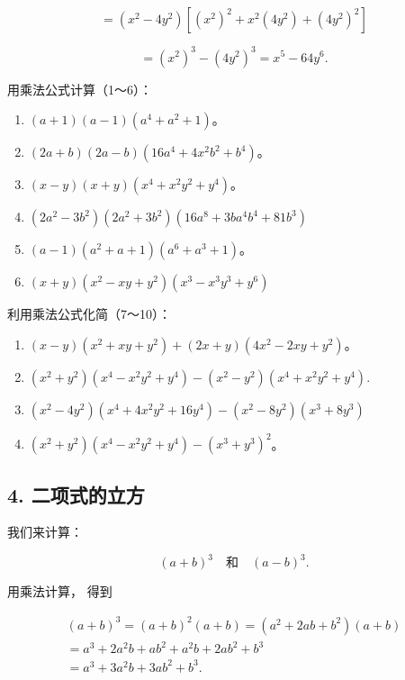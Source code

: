 \[
= (x ^{2} - 4 y ^{2}) [ (x ^{2}) ^{2} + x ^{2} (4 y ^{2}) + (4 y ^{2}) ^{2} ]
\]

\[
= (x ^{2}) ^{3} - (4 y ^{2}) ^{3} = x ^{5} - 64 y ^{6}.
\]

用乘法公式计算（1～6）：

\begin{enumerate}[start=1]
\item
  \((a + 1)(a - 1)(a^4 + a^2 + 1)\)。
\item
  \((2a + b)(2a - b)(16a^4 + 4x^2b^2 + b^4)\)。
\item
  \((x - y)(x + y)(x^4 + x^2y^2 + y^4)\)。
\item
  \((2a^{2} - 3b^{2})(2a^{2} + 3b^{2})(16a^{8} + 3b a^{4}b^{4} + 81b^{3})\)
\item
  \((a - 1)(a^2 + a + 1)(a^6 + a^3 + 1)\)。
\item
  \((x + y)(x^{2} - xy + y^{2})(x^{3} - x^{3}y^{3} + y^{6})\)
\end{enumerate}

利用乘法公式化简（7～10）：

\begin{enumerate}[start=7]
\item
  \((x - y)(x^2 + xy + y^2) + (2x + y)(4x^2 - 2xy + y^2)\)。
\item
  \((x^{2} + y^{2})(x^{4} - x^{2}y^{2} + y^{4}) - (x^{2} - y^{2})(x^{4} + x^{2}y^{2} + y^{4}).\)
\item
  \((x^{2} - 4y^{2})(x^{4} + 4x^{2}y^{2} + 16y^{4}) - (x^{2} - 8y^{2})(x^{3} + 8y^{3})\)
\item
  \((x^{2} + y^{2})(x^{4} - x^{2}y^{2} + y^{4}) - (x^{3} + y^{3})^{2}\)。
\end{enumerate}

\subsection{4. 二项式的立方}

我们来计算：

\[
(a + b) ^{3} \quad \text{和} \quad (a - b) ^{3}.
\]

用乘法计算， 得到

\[
\begin{array}{l} (a + b) ^{3} = (a + b) ^{2} (a + b) = (a ^{2} + 2 a b + b ^{2}) (a + b) \\ = a ^{3} + 2 a ^{2} b + a b ^{2} + a ^{2} b + 2 a b ^{2} + b ^{3} \\ = a ^{3} + 3 a ^{2} b + 3 a b ^{2} + b ^{3}. \\ \end{array}
\]

